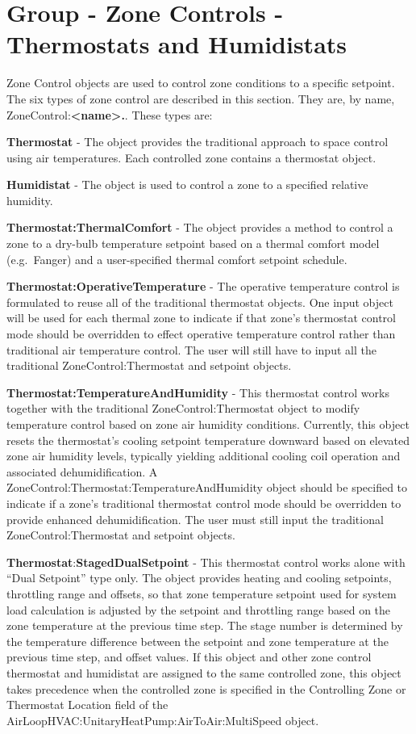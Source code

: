 \section{Group - Zone Controls - Thermostats and Humidistats}\label{group---zone-controls---thermostats-and-humidistats}

Zone Control objects are used to control zone conditions to a specific setpoint. The six types of zone control are described in this section. They are, by name, ZoneControl:\textbf{\textless{}name\textgreater{}.}. These types are:

\textbf{Thermostat} - The object provides the traditional approach to space control using air temperatures. Each controlled zone contains a thermostat object.

\textbf{Humidistat} - The object is used to control a zone to a specified relative humidity.

\textbf{Thermostat:ThermalComfort} - The object provides a method to control a zone to a dry-bulb temperature setpoint based on a thermal comfort model (e.g.~Fanger) and a user-specified thermal comfort setpoint schedule.

\textbf{Thermostat:OperativeTemperature} - The operative temperature control is formulated to reuse all of the traditional thermostat objects. One input object will be used for each thermal zone to indicate if that zone's thermostat control mode should be overridden to effect operative temperature control rather than traditional air temperature control. The user will still have to input all the traditional ZoneControl:Thermostat and setpoint objects.

\textbf{Thermostat:TemperatureAndHumidity} - This thermostat control works together with the traditional ZoneControl:Thermostat object to modify temperature control based on zone air humidity conditions. Currently, this object resets the thermostat's cooling setpoint temperature downward based on elevated zone air humidity levels, typically yielding additional cooling coil operation and associated dehumidification. A ZoneControl:Thermostat:TemperatureAndHumidity object should be specified to indicate if a zone's traditional thermostat control mode should be overridden to provide enhanced dehumidification. The user must still input the traditional ZoneControl:Thermostat and setpoint objects.

\textbf{Thermostat}:\textbf{StagedDualSetpoint} - This thermostat control works alone with ``Dual Setpoint'' type only. The object provides heating and cooling setpoints, throttling range and offsets, so that zone temperature setpoint used for system load calculation is adjusted by the setpoint and throttling range based on the zone temperature at the previous time step. The stage number is determined by the temperature difference between the setpoint and zone temperature at the previous time step, and offset values. If this object and other zone control thermostat and humidistat are assigned to the same controlled zone, this object takes precedence when the controlled zone is specified in the Controlling Zone or Thermostat Location field of the AirLoopHVAC:UnitaryHeatPump:AirToAir:MultiSpeed object.

